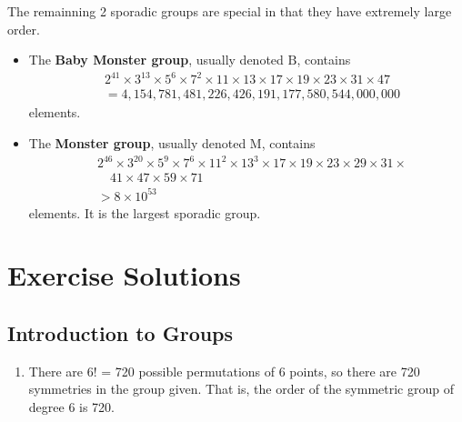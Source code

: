 The remainning 2 sporadic groups are special in that they have extremely large order.
\begin{itemize}
    \item The \textbf{Baby Monster group}, usually denoted $\mathrm{B}$, contains
    \begin{align*}
        &2^{41} \times 3^{13} \times 5^6 \times 7^2 \times 11 \times 13 \times 17 \times 19 \times 23 \times 31 \times 47\\
        &= 4,154,781,481,226,426,191,177,580,544,000,000
    \end{align*}
    elements.
    \item The \textbf{Monster group}, usually denoted $\mathrm{M}$, contains
    \begin{align*}
        &2^{46} \times 3^{20} \times 5^9 \times 7^6 \times 11^{2} \times 13^3 \times 17 \times 19 \times 23 \times 29 \times 31 \times \\
        &\quad 41 \times 47 \times 59 \times 71\\
        &> 8 \times 10^{53}
    \end{align*}
    elements. It is the largest sporadic group.
\end{itemize}

\appendix
\chapter{Exercise Solutions}

\section{Introduction to Groups}
\begin{enumerate}
    \item There are 6! = 720 possible permutations of 6 points, so there are 720 symmetries in the group given. That is, the order of the symmetric group of degree 6 is 720.
\end{enumerate}

